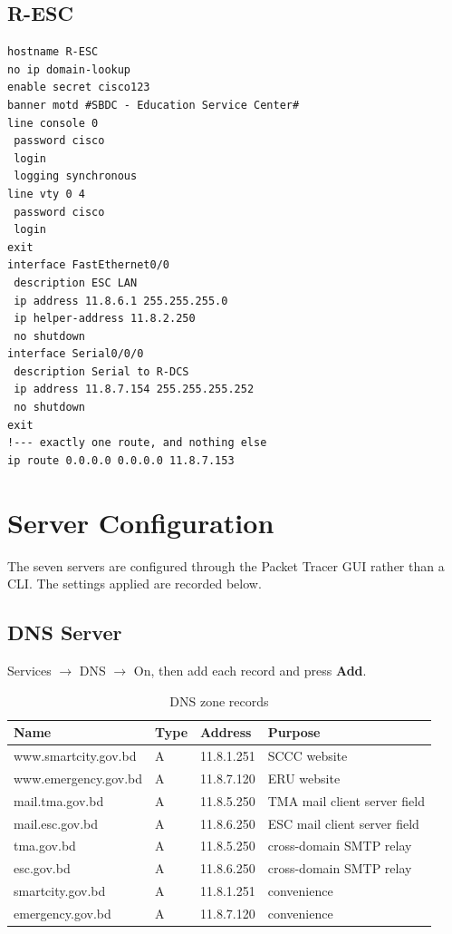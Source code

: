 \documentclass[11pt,a4paper]{article}
\begin{document}
\subsection{R-ESC}

\begin{lstlisting}
hostname R-ESC
no ip domain-lookup
enable secret cisco123
banner motd #SBDC - Education Service Center#
line console 0
 password cisco
 login
 logging synchronous
line vty 0 4
 password cisco
 login
exit
interface FastEthernet0/0
 description ESC LAN
 ip address 11.8.6.1 255.255.255.0
 ip helper-address 11.8.2.250
 no shutdown
interface Serial0/0/0
 description Serial to R-DCS
 ip address 11.8.7.154 255.255.255.252
 no shutdown
exit
!--- exactly one route, and nothing else
ip route 0.0.0.0 0.0.0.0 11.8.7.153
\end{lstlisting}

\clearpage
\section{Server Configuration}

The seven servers are configured through the Packet Tracer GUI rather than a
CLI. The settings applied are recorded below.

\subsection{DNS Server}

Services $\rightarrow$ DNS $\rightarrow$ On, then add each record and press
\textbf{Add}.

\begin{table}[htbp]
\centering
\caption{DNS zone records}
\label{tab:dns}
\small
\begin{tabular}{@{}llll@{}}
\toprule
\textbf{Name} & \textbf{Type} & \textbf{Address} & \textbf{Purpose} \\
\midrule
www.smartcity.gov.bd  & A & 11.8.1.251 & SCCC website \\
www.emergency.gov.bd  & A & 11.8.7.120 & ERU website \\
mail.tma.gov.bd       & A & 11.8.5.250 & TMA mail client server field \\
mail.esc.gov.bd       & A & 11.8.6.250 & ESC mail client server field \\
tma.gov.bd            & A & 11.8.5.250 & cross-domain SMTP relay \\
esc.gov.bd            & A & 11.8.6.250 & cross-domain SMTP relay \\
smartcity.gov.bd      & A & 11.8.1.251 & convenience \\
emergency.gov.bd      & A & 11.8.7.120 & convenience \\
\bottomrule
\end{tabular}
\end{table}
\end{document}
